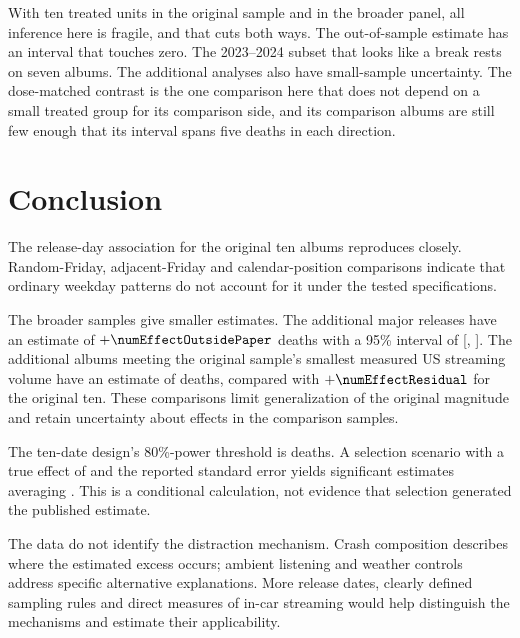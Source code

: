 \documentclass[11pt]{article}
\begin{document}
With ten treated units in the original sample and \numNAllAlbums{} in the broader panel, all
inference here is fragile, and that cuts both ways. The out-of-sample estimate has an interval
that touches zero. The 2023--2024 subset that looks like a break rests on seven albums.
The additional analyses also have small-sample uncertainty. The
dose-matched contrast is the one comparison here that does not depend on a small treated group
for its comparison side, and its \numNDoseMatched{} comparison albums are still few enough that
its interval spans five deaths in each direction.

\section{Conclusion}

The release-day association for the original ten albums reproduces closely. Random-Friday,
adjacent-Friday and calendar-position comparisons indicate that ordinary weekday patterns do
not account for it under the tested specifications.

The broader samples give smaller estimates. The additional major releases have an estimate of
$+\numEffectOutsidePaper$ deaths with a 95\% interval of
[\numCIOutsideLo, \numCIOutsideHi]. The \numNDoseMatched{} additional albums meeting the
original sample's smallest measured US streaming volume have an estimate of
\numEffectDoseMatched{} deaths, compared with $+\numEffectResidual$ for the original ten.
These comparisons limit generalization of the original magnitude and retain uncertainty
about effects in the comparison samples.

The ten-date design's 80\%-power threshold is \numMDEEighty{} deaths. A selection scenario
with a true effect of \numEffectOutsidePaper{} and the reported standard error yields
significant estimates averaging \numMeanPublishedAtOutside{}. This is a conditional
calculation, not evidence that selection generated the published estimate.

The data do not identify the distraction mechanism. Crash composition describes where the
estimated excess occurs; ambient listening and weather controls address specific alternative
explanations. More release dates, clearly defined sampling rules and direct measures of
in-car streaming would help distinguish the mechanisms and estimate their applicability.



\end{document}
